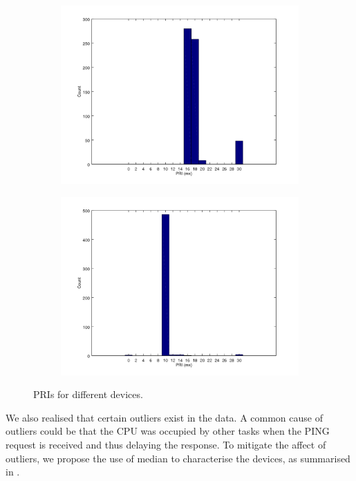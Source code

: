 \begin{figure}
	\begin{subfigure}{0.45\linewidth}
		\includegraphics[width=\linewidth]{fig/helloworld_sky.png}
	\end{subfigure}
	\begin{subfigure}{0.45\linewidth}
		\includegraphics[width=\linewidth]{fig/helloworld_CC2538.png}
	\end{subfigure}
	\caption{PRIs for different devices. \label{PRIs}}
\end{figure}

We also realised that certain outliers exist in the data. A common cause of outliers could be that the CPU was occupied by other tasks when the PING request is received and thus delaying the response. To mitigate the affect of outliers, we propose the use of median to characterise the devices, as summarised in .

